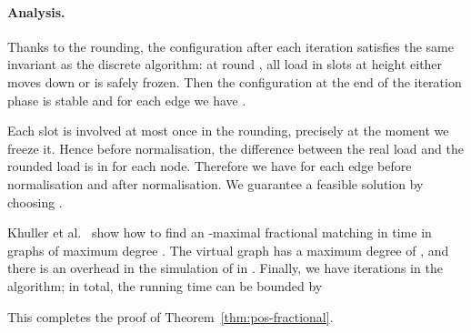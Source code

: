 \paragraph{Analysis.}

Thanks to the rounding, the configuration after each iteration satisfies the same invariant as the discrete algorithm: at round , all load in slots at height  either moves down or is safely frozen. Then the configuration at the end of the iteration phase is stable and for each edge  we have . 

Each slot is involved at most once in the rounding, precisely at the moment we freeze it. Hence before normalisation, the difference between the real load and the rounded load is in  for each node. Therefore we have  for each edge  before normalisation and  after normalisation. We guarantee a feasible solution by choosing .

Khuller et al.~\cite{khuller94primal-dual} show how to find an -maximal fractional matching in time  in graphs of maximum degree . The virtual graph  has a maximum degree of , and there is an  overhead in the simulation of  in . Finally, we have  iterations in the algorithm; in total, the running time can be bounded by
 
This completes the proof of Theorem~\ref{thm:pos-fractional}.

